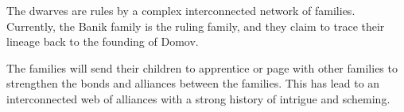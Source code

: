 The dwarves are rules by a complex interconnected network of families.
Currently, the Banik family is the ruling family, and they claim to trace their lineage back to the founding of Domov.

The families will send their children to apprentice or page with other families to strengthen the bonds and alliances between the families.
This has lead to an interconnected web of alliances with a strong history of intrigue and scheming.
